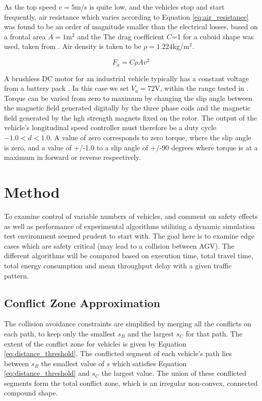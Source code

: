As the top speed $v=5$m/s is quite low, and the vehicles stop and start frequently, air resistance which varies according to Equation \ref{eq:air_resistance} was found to be an order of magnitude smaller than the electrical losses, based on a frontal area $A=1$m$^2$ and the The drag coefficient $C$=1 for a cuboid shape was used, taken from \cite{Toolbox2004}. Air density is taken to be $\rho=1.224$kg/m$^2$.

\begin{equation}
	F_a = C\rho A v^2 
	\label{eq:air_resistance}
\end{equation}

A brushless DC motor for an industrial vehicle typically has a constant voltage from a battery pack \cite{Hyster2020a}. In this case we set $V_a=$72V, within the range tested in \cite{Racewicz2018}. Torque can be varied from zero to maximum by changing the slip angle between the magnetic field generated digitally by the three phase coils and the magnetic field generated by the hgh strength magnets fixed on  the rotor. The output of the vehicle's longitudinal speed controller must therefore be a duty cycle $-1.0<d<1.0$. A value of zero corresponds to zero torque, where the slip angle is zero, and a value of +/-1.0 to a slip angle of +/-90 degrees where torque is at a maximum in forward or reverse respectively.


\section{Method}
To examine control of variable numbers of vehicles, and comment on safety effects as well as performance of experimental algorithms utilizing a dynamic simulation test environment seemed prudent to start with. The goal here is to examine edge cases which are safety critical (may lead to a collision between AGV). The different algorithms will be compared based on execution time, total travel time, total energy consumption and mean throughput delay with a given traffic pattern.

\subsection{Conflict Zone Approximation}
\label{sec:conflict_zone}
The collision avoidance constraints are simplified by merging all the conflicts on each path, to keep only the smallest $s_B$ and the largest $s_C$ for that path. The extent of the conflict zone for vehicle$i$ is given by Equation \ref{eq:distance_threshold}. The conflicted segment of each vehicle's path lies between $s_B$ the smallest value of $s$ which satisfies Equation \ref{eq:distance_threshold} and $s_C$ the largest value. The union of these conflicted segments form the total conflict zone, which is an irregular non-convex, connected compound shape. 

